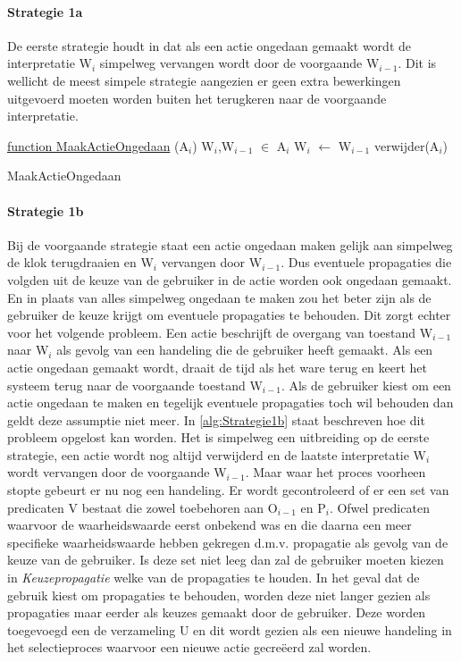 \paragraph{Strategie 1a}
De eerste strategie houdt in dat als een actie ongedaan gemaakt wordt de interpretatie W$_{i}$ simpelweg vervangen wordt door de voorgaande W$_{i-1}$. Dit is wellicht de meest simpele strategie aangezien er geen extra bewerkingen uitgevoerd moeten worden buiten het terugkeren naar de voorgaande interpretatie.

\begin{algorithm}
	\underline{function MaakActieOngedaan} (A$_{i}$)\;
	{W$_{i}$,W$_{i-1}$} $\in$ A$_{i}$\;
	W$_{i}$ $\leftarrow$ W$_{i-1}$\;	
	verwijder(A$_{i}$)\;
	\caption{MaakActieOngedaan\label{alg:Strategie1a}}
\end{algorithm}

\paragraph{Strategie 1b}
Bij de voorgaande strategie staat een actie ongedaan maken gelijk aan simpelweg de klok terugdraaien en W$_{i}$ vervangen door W$_{i-1}$. Dus eventuele propagaties die volgden uit de keuze van de gebruiker in de actie worden ook ongedaan gemaakt. En in plaats van alles simpelweg ongedaan te maken zou het beter zijn als de gebruiker de keuze krijgt om eventuele propagaties te behouden. Dit zorgt echter voor het volgende probleem. Een actie beschrijft de overgang van toestand W$_{i-1}$ naar W$_{i}$ als gevolg van een handeling die de gebruiker heeft gemaakt. Als een actie ongedaan gemaakt wordt, draait de tijd als het ware terug en keert het systeem terug naar de voorgaande toestand W$_{i-1}$. Als de gebruiker kiest om een actie ongedaan te maken en tegelijk eventuele propagaties toch wil behouden dan geldt deze assumptie niet meer. In \ref{alg:Strategie1b} staat beschreven hoe dit probleem opgelost kan worden. Het is simpelweg een uitbreiding op de eerste strategie, een actie wordt nog altijd verwijderd en de laatste interpretatie W$_{i}$ wordt vervangen door de voorgaande W$_{i-1}$. Maar waar het proces voorheen stopte gebeurt er nu nog een handeling. Er wordt gecontroleerd of er een set van predicaten V bestaat die zowel toebehoren aan O$_{i-1}$ en P$_{i}$. Ofwel predicaten waarvoor de waarheidswaarde eerst onbekend was en die daarna een meer specifieke waarheidswaarde hebben gekregen d.m.v. propagatie als gevolg van de keuze van de gebruiker. Is deze set niet leeg dan zal de gebruiker moeten kiezen in \textit{Keuzepropagatie} welke van de propagaties te houden. In het geval dat de gebruik kiest om propagaties te behouden, worden deze niet langer gezien als propagaties maar eerder als keuzes gemaakt door de gebruiker. Deze worden toegevoegd een de verzameling U en dit wordt gezien als een nieuwe handeling in het selectieproces waarvoor een nieuwe actie gecre\"{e}erd zal worden.

